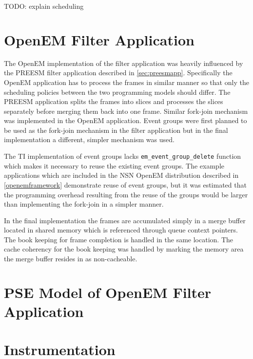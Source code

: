 TODO: explain scheduling

\section{OpenEM Filter Application}
The OpenEM implementation of the filter application was heavily influenced by
the PREESM filter application described in \ref{sec:preesmapp}. Specifically the
OpenEM application has to process the frames in similar manner so that only the
scheduling policies between the two programming models should differ. The PREESM
application splits the frames into slices and processes the slices separately
before merging them back into one frame. Similar fork-join mechanism was
implemented in the OpenEM application. Event groups were first planned to be
used as the fork-join mechanism in the filter application but in the final
implementation a different, simpler mechanism was used.

The TI implementation of event groups lacks \texttt{em\_event\_group\_delete}
function which makes it necessary to reuse the existing event groups. The
example applications which are included in the NSN OpenEM distribution described
in \ref{openemframework} demonstrate reuse of event groups, but it was estimated
that the programming overhead resulting from the reuse of the groups would be
larger than implementing the fork-join in a simpler manner.

In the final implementation the frames are accumulated simply in a merge buffer
located in shared memory which is referenced through queue context pointers. The
book keeping for frame completion is handled in the same location. The cache
coherency for the book keeping was handled by marking the memory area the merge
buffer resides in as non-cacheable.

\section{PSE Model of OpenEM Filter Application}
\section{Instrumentation}
